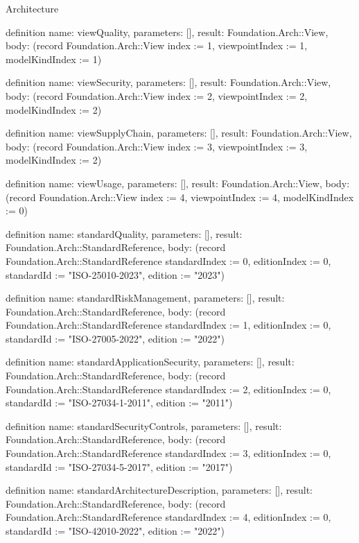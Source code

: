 \begin{lexlean}{Architecture}
\begin{semanticmodule}
definition{
  name: viewQuality,
  parameters: [],
  result: Foundation.Arch::View,
  body: (record Foundation.Arch::View {index := 1, viewpointIndex := 1, modelKindIndex := 1})
}

definition{
  name: viewSecurity,
  parameters: [],
  result: Foundation.Arch::View,
  body: (record Foundation.Arch::View {index := 2, viewpointIndex := 2, modelKindIndex := 2})
}

definition{
  name: viewSupplyChain,
  parameters: [],
  result: Foundation.Arch::View,
  body: (record Foundation.Arch::View {index := 3, viewpointIndex := 3, modelKindIndex := 2})
}

definition{
  name: viewUsage,
  parameters: [],
  result: Foundation.Arch::View,
  body: (record Foundation.Arch::View {index := 4, viewpointIndex := 4, modelKindIndex := 0})
}

definition{
  name: standardQuality,
  parameters: [],
  result: Foundation.Arch::StandardReference,
  body: (record Foundation.Arch::StandardReference {standardIndex := 0, editionIndex := 0, standardId := "ISO-25010-2023", edition := "2023"})
}

definition{
  name: standardRiskManagement,
  parameters: [],
  result: Foundation.Arch::StandardReference,
  body: (record Foundation.Arch::StandardReference {standardIndex := 1, editionIndex := 0, standardId := "ISO-27005-2022", edition := "2022"})
}

definition{
  name: standardApplicationSecurity,
  parameters: [],
  result: Foundation.Arch::StandardReference,
  body: (record Foundation.Arch::StandardReference {standardIndex := 2, editionIndex := 0, standardId := "ISO-27034-1-2011", edition := "2011"})
}

definition{
  name: standardSecurityControls,
  parameters: [],
  result: Foundation.Arch::StandardReference,
  body: (record Foundation.Arch::StandardReference {standardIndex := 3, editionIndex := 0, standardId := "ISO-27034-5-2017", edition := "2017"})
}

definition{
  name: standardArchitectureDescription,
  parameters: [],
  result: Foundation.Arch::StandardReference,
  body: (record Foundation.Arch::StandardReference {standardIndex := 4, editionIndex := 0, standardId := "ISO-42010-2022", edition := "2022"})
}
\end{semanticmodule}
\end{lexlean}
